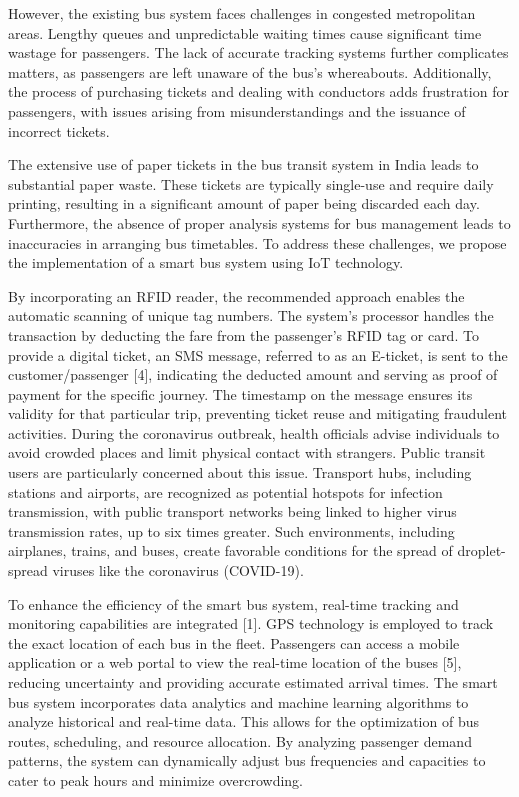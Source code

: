 \documentclass[conference]{IEEEtran}
\begin{document}
However, the existing bus system faces challenges in congested metropolitan areas. Lengthy queues and unpredictable waiting times cause significant time wastage for passengers. The lack of accurate tracking systems further complicates matters, as passengers are left unaware of the bus's whereabouts. Additionally, the process of purchasing tickets and dealing with conductors adds frustration for passengers, with issues arising from misunderstandings and the issuance of incorrect tickets.

The extensive use of paper tickets in the bus transit system in India leads to substantial paper waste. These tickets are typically single-use and require daily printing, resulting in a significant amount of paper being discarded each day. Furthermore, the absence of proper analysis systems for bus management leads to inaccuracies in arranging bus timetables. To address these challenges, we propose the implementation of a smart bus system using IoT technology.

By incorporating an RFID reader, the recommended approach enables the automatic scanning of unique tag numbers. The system's processor handles the transaction by deducting the fare from the passenger's RFID tag or card. To provide a digital ticket, an SMS message, referred to as an E-ticket, is sent to the customer/passenger [4], indicating the deducted amount and serving as proof of payment for the specific journey. The timestamp on the message ensures its validity for that particular trip, preventing ticket reuse and mitigating fraudulent activities.
During the coronavirus outbreak, health officials advise individuals to avoid crowded places and limit physical contact with strangers. Public transit users are particularly concerned about this issue. Transport hubs, including stations and airports, are recognized as potential hotspots for infection transmission, with public transport networks being linked to higher virus transmission rates, up to six times greater. Such environments, including airplanes, trains, and buses, create favorable conditions for the spread of droplet-spread viruses like the coronavirus (COVID-19).

To enhance the efficiency of the smart bus system, real-time tracking and monitoring capabilities are integrated [1]. GPS technology is employed to track the exact location of each bus in the fleet. Passengers can access a mobile application or a web portal to view the real-time location of the buses [5], reducing uncertainty and providing accurate estimated arrival times. The smart bus system incorporates data analytics and machine learning algorithms to analyze historical and real-time data. This allows for the optimization of bus routes, scheduling, and resource allocation. By analyzing passenger demand patterns, the system can dynamically adjust bus frequencies and capacities to cater to peak hours and minimize overcrowding.
\end{document}
